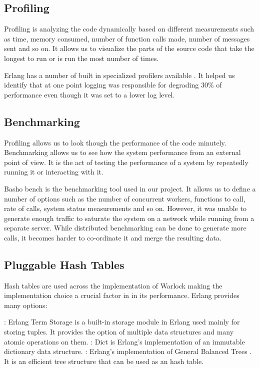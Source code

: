 \subsection{Profiling}
\label{section:impl.profiling}

Profiling is analyzing the code dynamically based on different measurements such
as  time, memory consumed, number of function calls made, number of
messages
sent and so on. It allows us to visualize the parts of the source code that take
the longest to run or is run the most number of times.

Erlang has a number of built in specialized profilers available
\citep{erlang.profiling}. It helped us identify that at one point logging was
responsible for degrading 30\% of performance even though it was set to a
lower log level.

\subsection{Benchmarking}

Profiling allows us to look though the performance of the code minutely.
Benchmarking allows us to see how the system performance from an external
point of view. It is the act of testing the performance of a system by
repeatedly running it or interacting with it.

Basho bench \citep{basho.bench} is the benchmarking tool used in our project.
It allows us to define a number of options such as the number of concurrent
workers, functions to call, rate of calls, system status measurements and so
on. However, it was unable to generate enough traffic to saturate the system
on a network while running from a separate server. While distributed
benchmarking can be done to generate more calls, it becomes harder to
co-ordinate it and merge the resulting data.

\subsection{Pluggable Hash Tables}

Hash tables are used across the implementation of Warlock making the
implementation choice a crucial factor in in its performance. Erlang provides
many options:

\begin{itemize}
    : Erlang Term Storage is a built-in storage module in Erlang
    used mainly for storing tuples. It provides the option of multiple data
    structures and many atomic operations on them.
    : Dict is Erlang's implementation of an immutable dictionary
    data structure.
    : Erlang's implementation of General Balanced Trees
    \citep{Andersson99}. It is an efficient tree structure that can be used
    as an hash table.
\end{itemize}

